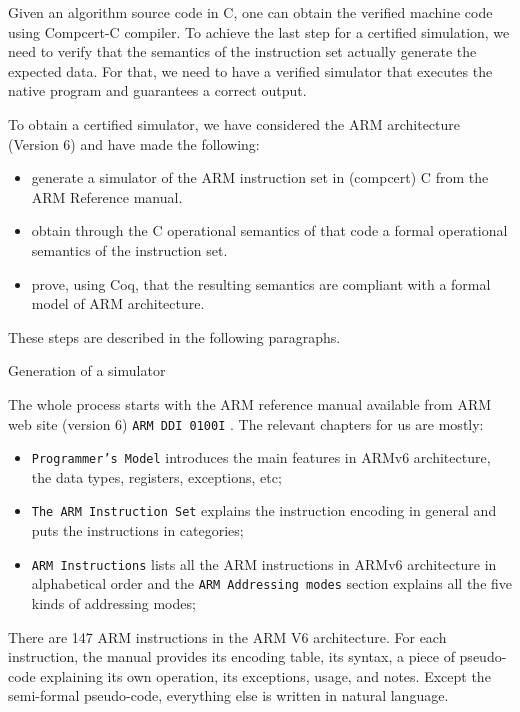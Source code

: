 \documentclass[twocolumn]{article}
\makeatletter
\def\subsection{\@startsection {subsection}{2}{\z@}{16pt plus 2pt minus 2pt}
{6pt plus 2pt minus 2pt}{\normalsize\sl
\edef\@svsec{\thesubsection.\ }}}
\def\thesubsection{\Alph{subsection}}
\newcommand{\stt}{\small\tt}
\makeatother
\begin{document}
Given an algorithm source code in C, one can obtain the verified
machine code using Compcert-C compiler. To achieve the last step for a
certified simulation, we need to verify that the semantics of the
instruction set actually generate the expected data. For that, we need
to have a verified simulator that executes the native program and
guarantees a correct output.

To obtain a certified simulator, we have considered the ARM architecture
(Version 6) and have made the following:
\begin{itemize}
\item generate a simulator of the ARM instruction set in (compcert) C
  from the ARM Reference manual.
\item obtain through the C operational semantics of that code a formal
  operational semantics of the instruction set.
\item prove, using Coq, that the resulting semantics are compliant with
a formal model of ARM architecture.
\end{itemize}

These steps are described in the following paragraphs.

\subsection{Generation of a simulator}

The whole process starts with the ARM reference manual
available from ARM web site (version 6) {\stt ARM DDI 0100I}
\cite{arm6refman}. The relevant chapters for us are mostly:
\begin{itemize}
\item
\texttt{Programmer's Model} introduces the main features in ARMv6 architecture,
the data types, registers, exceptions, etc;
\item
\texttt{The ARM Instruction Set}
explains the instruction encoding in general and puts the instructions in
categories;
\item \texttt{ARM Instructions} lists all the ARM instructions in
  ARMv6 architecture in alphabetical order and the \texttt{ARM
    Addressing modes} section explains all the five kinds of
  addressing modes;
\end{itemize}

There are 147 ARM instructions in the ARM V6 architecture.  For each
instruction, the manual provides its encoding table, its syntax, a
piece of pseudo-code explaining its own operation, its exceptions,
usage, and notes.  Except the semi-formal pseudo-code, everything else
is written in natural language.
\end{document}
